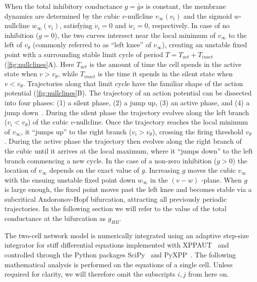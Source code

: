 When the total inhibitory conductance $g = \bar g s$ is constant, the membrane dynamics are determined by the cubic $v$-nullcline $v_{\infty}(v_i)$ and the sigmoid $w$-nullcline $w_{\infty}(v_{i})$, satisfying $\dot v_{i}=0$ and $\dot w_{i}=0$, respectively.
In case of no inhibition ($g=0$), the two curves intersect near the local minimum of $v_{\infty}$ to the left of $v_{\theta}$ (commonly referred to as ``left knee'' of $v_{\infty}$), creating an unstable fixed point with a surrounding stable limit cycle of period $T=T_{act}+T_{inact}$ (\cref{fig:nullclines}A).
Here $T_{act}$ is the amount of time the cell spends in the active state when $v>v_\theta$, while $T_{inact}$ is the time it spends in the silent state when $v<v_\theta$.
Trajectories along that limit cycle have the familiar shape of the action potential (\cref{fig:nullclines}B).
The trajectory of an action potential can be dissected into four phases: (1) a silent phase, (2) a jump up, (3) an active phase, and (4) a jump down~\citep[see e.g.][]{ermentrout2010}.
During the silent phase the trajectory evolves along the left branch ($v_{i}<v_{\theta}$) of the cubic $v$-nullcline.
Once the trajectory reaches the local minimum of $v_{\infty}$, it ``jumps up'' to the right branch ($v_{i}>v_{\theta}$), crossing the firing threshold $v_{\theta}$.
During the active phase the trajectory then evolves along the right branch of the cubic until it arrives at the local maximum, where it ``jumps down'' to the left branch commencing a new cycle.
In the case of a non-zero inhibition ($g>0$) the location of $v_{\infty}$ depends on the exact value of $g$.
Increasing $g$ moves the cubic $v_{\infty}$ with the ensuing unstable fixed point down $w_{\infty}$ in the $(v-w)$ -plane.
When $g$ is large enough, the fixed point moves past the left knee and becomes stable via a subcritical Andoronov-Hopf bifurcation, attracting all previously periodic trajectories.
In the following section we will refer to the value of the total conductance at the bifurcation as $g_{HB}$.

The two-cell network model is numerically integrated using an adaptive step-size integrator for stiff differential equations implemented with XPPAUT~\citep{ermentrout2002} and controlled through the Python packages SciPy~\citep{scipy2020} and PyXPP~\citep{pyxpp}. The following mathematical analysis is performed on the equations of a single cell. Unless required for clarity, we will therefore omit the subscripts $i,j$ from here on.
